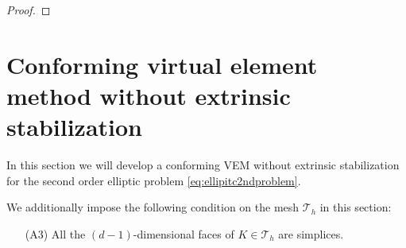 \documentclass[10pt]{amsart}
\renewcommand{\div}{\operatorname{div}}
\numberwithin{equation}{section}
\begin{document}
\begin{proof}
\end{proof}





\section{Conforming virtual element method without extrinsic stabilization}\label{sec:stabfreecfmvem}

In this section we will develop a conforming VEM without extrinsic stabilization for the second order elliptic problem \eqref{eq:ellipitc2ndproblem}.

We additionally impose the following condition on the mesh $\mathcal T_h$ in this section:
\begin{itemize}
 \item[(A3)] All the $(d-1)$-dimensional faces of $K\in \mathcal T_h$ are simplices.
\end{itemize}
\end{document}
